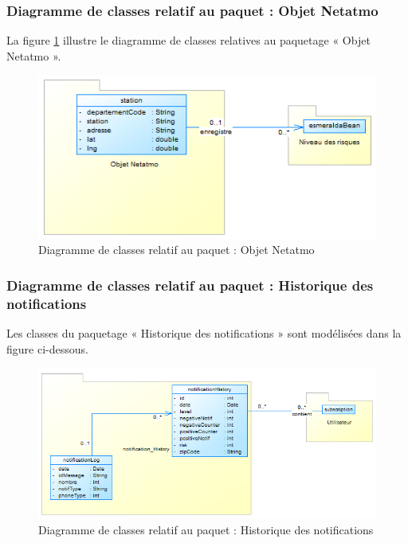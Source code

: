 \newpage
\subsubsection{Diagramme de classes relatif au paquet : Objet Netatmo}

\qquad La figure \ref{fig3.6} illustre le diagramme de classes relatives au paquetage « Objet Netatmo ».

\begin{figure}[!h]
	\begin{center}
		\includegraphics[width=0.64\textheight]{figures/pckg4}
	\end{center}
	\caption{Diagramme de classes relatif au paquet : Objet Netatmo}
	\label{fig3.6}
\end{figure}

\subsubsection{Diagramme de classes relatif au paquet : Historique des notifications}
\qquad Les classes du paquetage « Historique des notifications » sont modélisées dans la figure ci-dessous.

\begin{figure}[!h]
	\begin{center}
		\includegraphics[width=0.64\textheight]{figures/pckg5}
	\end{center}
	\caption{Diagramme de classes relatif au paquet : Historique des notifications}
	\label{fig3.7}
\end{figure}

